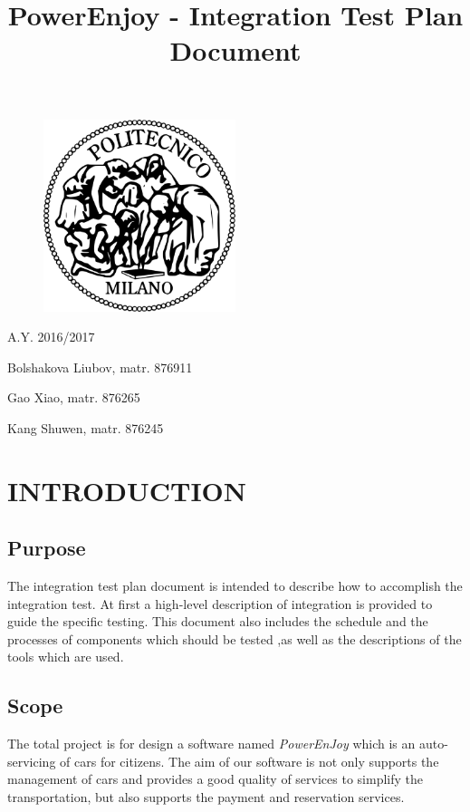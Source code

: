\documentclass[a4paper,11pt]{article}
\title{PowerEnjoy - Integration Test Plan Document}
\begin{document}
\begin{titlepage}
\begin{figure}
	\centering
	\includegraphics[width=0.5\textwidth]{images/polimi}
\end{figure}
\maketitle
\centering
A.Y. 2016/2017

Bolshakova Liubov, matr. 876911 

Gao Xiao, matr. 876265 

Kang Shuwen, matr. 876245

\end{titlepage}

\tableofcontents
\newpage
	
\section{INTRODUCTION}
	\subsection{Purpose}
	The integration test plan document is intended to describe how to accomplish the integration test. At first a high-level description of integration is provided to guide the specific testing. This document also includes the schedule and the processes of components which should be tested ,as well as the descriptions of the tools which are used.
	 
	\subsection{Scope}	
	
The total project is for design a software named \textsl{PowerEnJoy} which is an auto-servicing of cars for citizens. The aim of our software is not only supports the management of cars and provides a good quality of services to simplify the transportation, but also supports the payment and reservation services.
\end{document}
